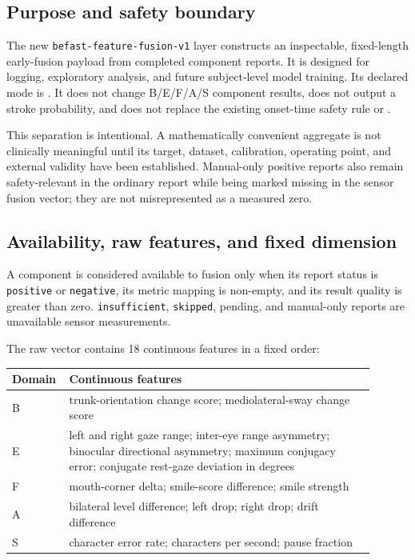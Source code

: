 \documentclass[11pt,a4paper]{article}
\begin{document}
\subsection{Purpose and safety boundary}

The new \texttt{befast-feature-fusion-v1} layer constructs an inspectable, fixed-length early-fusion payload from completed component reports. It is designed for logging, exploratory analysis, and future subject-level model training. Its declared mode is . It does not change B/E/F/A/S component results, does not output a stroke probability, and does not replace the existing onset-time safety rule or .

This separation is intentional. A mathematically convenient aggregate is not clinically meaningful until its target, dataset, calibration, operating point, and external validity have been established. Manual-only positive reports also remain safety-relevant in the ordinary report while being marked missing in the sensor fusion vector; they are not misrepresented as a measured zero.

\subsection{Availability, raw features, and fixed dimension}

A component is considered available to fusion only when its report status is \texttt{positive} or \texttt{negative}, its metric mapping is non-empty, and its result quality is greater than zero. \texttt{insufficient}, \texttt{skipped}, pending, and manual-only reports are unavailable sensor measurements.

The raw vector contains 18 continuous features in a fixed order:

\begin{longtable}{p{0.10\linewidth}p{0.80\linewidth}}
\toprule
Domain & Continuous features \\
\midrule
B & trunk-orientation change score; mediolateral-sway change score \\
E & left and right gaze range; inter-eye range asymmetry; binocular directional asymmetry; maximum conjugacy error; conjugate rest-gaze deviation in degrees \\
F & mouth-corner delta; smile-score difference; smile strength \\
A & bilateral level difference; left drop; right drop; drift difference \\
S & character error rate; characters per second; pause fraction \\
\bottomrule
\end{longtable}
\end{document}
